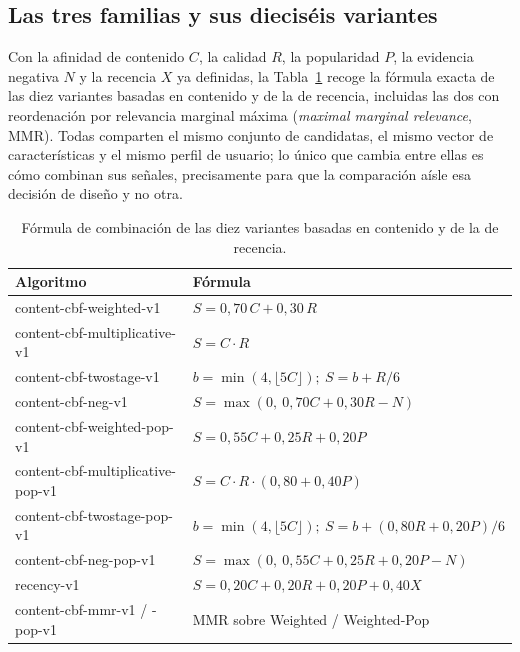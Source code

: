 \subsection{Las tres familias y sus dieciséis variantes}\label{sec:alg-familias}

Con la afinidad de contenido \(C\), la calidad \(R\), la popularidad \(P\), la evidencia
negativa \(N\) y la recencia \(X\) ya definidas, la Tabla~\ref{tab:variantes-contenido} recoge
la fórmula exacta de las diez variantes basadas en contenido y de la de recencia, incluidas las dos con
reordenación por relevancia marginal máxima (\textit{maximal marginal relevance}, MMR). Todas comparten el mismo conjunto
de candidatas, el mismo vector de características y el mismo perfil de usuario; lo único que cambia
entre ellas es cómo combinan sus señales, precisamente para que la comparación aísle esa
decisión de diseño y no otra.

\begin{table}[H]
\centering
\caption{Fórmula de combinación de las diez variantes basadas en contenido y de la de recencia.}\label{tab:variantes-contenido}
\small
\begin{tabularx}{\textwidth}{@{}>{\ttfamily\raggedright\arraybackslash}p{}>{\raggedleft\arraybackslash}X@{}}
\textnormal{Algoritmo} & \textnormal{Fórmula} \\
\hline
content-cbf-weighted-v1 & \(S = 0{,}70\,C + 0{,}30\,R\) \\
content-cbf-multiplicative-v1 & \(S = C \cdot R\) \\
content-cbf-twostage-v1 & \(b=\min(4,\lfloor 5C\rfloor);\ S = b + R/6\) \\
content-cbf-neg-v1 & \(S = \max(0,\ 0{,}70C + 0{,}30R - N)\) \\
content-cbf-weighted-pop-v1 & \(S = 0{,}55C + 0{,}25R + 0{,}20P\) \\
content-cbf-multiplicative-pop-v1 & \(S = C \cdot R \cdot (0{,}80 + 0{,}40P)\) \\
content-cbf-twostage-pop-v1 & \(b=\min(4,\lfloor 5C\rfloor);\ S = b + (0{,}80R+0{,}20P)/6\) \\
content-cbf-neg-pop-v1 & \(S = \max(0,\ 0{,}55C + 0{,}25R + 0{,}20P - N)\) \\
recency-v1 & \(S = 0{,}20C + 0{,}20R + 0{,}20P + 0{,}40X\) \\
content-cbf-mmr-v1 / -pop-v1 & MMR sobre Weighted / Weighted-Pop \\
\end{tabularx}
\end{table}

